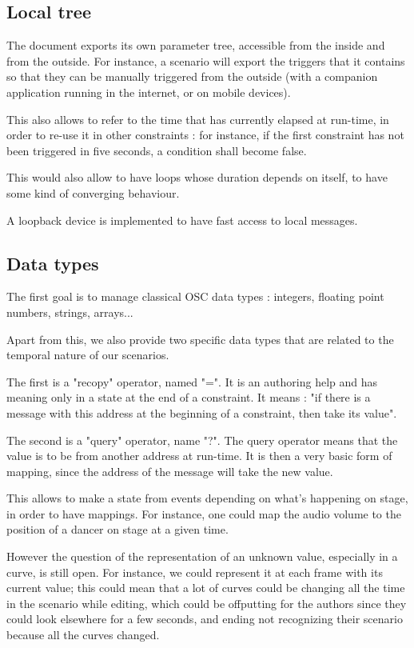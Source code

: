 \documentclass{sigchi}
\begin{document}
\subsection{Local tree}
The document exports its own parameter tree, accessible from the inside and from the outside.
For instance, a scenario will export the triggers that it contains so that they can be manually triggered from the outside (with a companion application running in the internet, or on mobile devices).

This also allows to refer to the time that has currently elapsed at run-time, in order to re-use it in other constraints : for instance, if the first constraint has not been triggered in five seconds, a condition shall become false.

This would also allow to have loops whose duration depends on itself, to have some kind of converging behaviour.

A loopback device is implemented to have fast access to local messages.

\subsection{Data types}
The first goal is to manage classical OSC data types : integers, floating point numbers, strings, arrays...

Apart from this, we also provide two specific data types that are related to the temporal nature of our scenarios.

The first is a "recopy" operator, named "=". It is an authoring help and has meaning only in a state at the end of a constraint. It means : "if there is a message with this address at the beginning of a constraint, then take its value".

The second is a "query" operator, name "?". The query operator means that the value is to be from another address at run-time. It is then a very basic form of mapping, since the address of the message will take the new value.

This allows to make a state from events depending on what's happening on stage, in order to have mappings. For instance, one could map the audio volume to the position of a dancer on stage at a given time.

However the question of the representation of an unknown value, especially in a curve, is still open. For instance, we could represent it at each frame with its current value; this could mean that a lot of curves could be changing all the time in the scenario while editing, which could be offputting for the authors since they could look elsewhere for a few seconds, and ending not recognizing their scenario because all the curves changed. 
\end{document}
